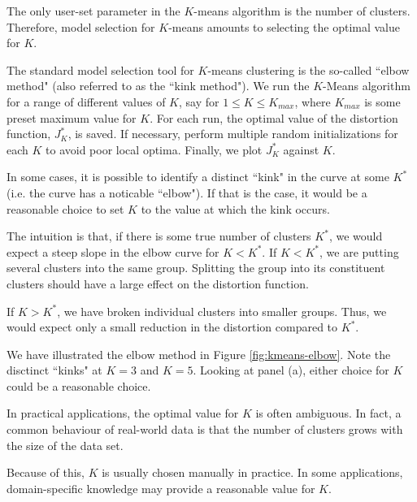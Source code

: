 \documentclass[final,3p,times,twocolumn]{elsarticle}
\begin{document}
The only user-set parameter in the $K$-means algorithm is the number of clusters.
Therefore, model selection for $K$-means amounts to selecting the optimal value for $K$.

The standard model selection tool for $K$-means clustering is the so-called ``elbow method" (also referred to as the ``kink method").
We run the $K$-Means algorithm for a range of different values of $K$, say for $1 \leq K \leq K_{max}$, where $K_{max}$ is some preset maximum value for $K$.
For each run, the optimal value of the distortion function, $J^*_K$, is saved.
If necessary, perform multiple random initializations for each $K$ to avoid poor local optima.
Finally, we plot $J_K^*$ against $K$.

In some cases, it is possible to identify a distinct ``kink" in the curve at some $K^*$ (i.e. the curve has a noticable ``elbow").
If that is the case, it would be a reasonable choice to set $K$ to the value at which the kink occurs.

The intuition is that, if there is some true number of clusters $K^*$, we would expect a steep slope in the elbow curve for $K < K^*$.
If $K < K^*$, we are putting several clusters into the same group. 
Splitting the group into its constituent clusters should have a large effect on the distortion function.

If $K > K^*$, we have broken individual clusters into smaller groups.
Thus, we would expect only a small reduction in the distortion compared to $K^*$.

We have illustrated the elbow method in Figure \ref{fig:kmeans-elbow}.
Note the disctinct ``kinks" at $K=3$ and $K=5$.
Looking at panel (a), either choice for $K$ could be a reasonable choice.

In practical applications, the optimal value for $K$ is often ambiguous.
In fact, a common behaviour of real-world data is that the number of clusters grows with the size of the data set.

Because of this, $K$ is usually chosen manually in practice.
In some applications, domain-specific knowledge may provide a reasonable value for $K$.
\end{document}
